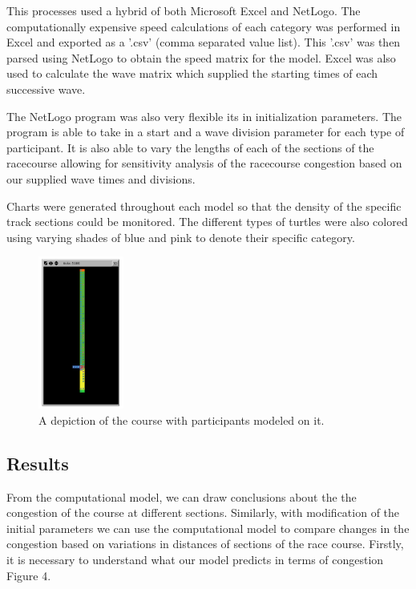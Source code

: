 \documentclass[12pt]{article}
\begin{document}
This processes used a hybrid of both Microsoft Excel and NetLogo. The computationally expensive speed calculations of each category was performed in Excel and exported as a '.csv' (comma separated value list). This '.csv' was then parsed using NetLogo to obtain the speed matrix for the model. Excel was also used to calculate the wave matrix which supplied the starting times of each successive wave.

The NetLogo program was also very flexible its in initialization parameters. The program is able to take in a start and a wave division parameter for each type of participant. It is also able to vary the lengths of each of the sections of the racecourse allowing for sensitivity analysis of the racecourse congestion based on our supplied wave times and divisions.

Charts were generated throughout each model so that the density of the specific track sections could be monitored. The different types of turtles were also colored using varying shades of blue and pink to denote their specific category.

\begin{figure}[H]
\label{fig:racecourse}
  \centering
  \includegraphics[width=0.25\textwidth]{RaceCourseWithTurtles}
  \caption{A depiction of the course with participants modeled on it.}
\end{figure}

\subsection{Results}
From the computational model, we can draw conclusions about the the congestion of the course at different sections. Similarly, with modification of the initial parameters we can use the computational model to compare changes in the congestion based on variations in distances of sections of the race course. Firstly, it is necessary to understand what our model predicts in terms of congestion Figure 4.
\end{document}
